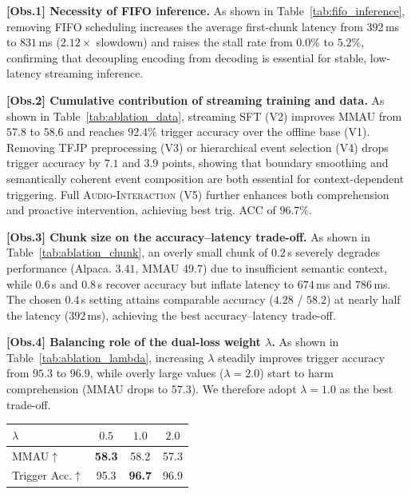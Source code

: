 \documentclass{article}
\begin{document}
\textbf{[Obs.1] Necessity of FIFO inference.} As shown in Table~\ref{tab:fifo_inference}, removing FIFO scheduling increases the average first-chunk latency from $392$\,ms to $831$\,ms ($2.12\times$ slowdown) and raises the stall rate from $0.0\%$ to $5.2\%$, confirming that decoupling encoding from decoding is essential for stable, low-latency streaming inference.

\textbf{[Obs.2] Cumulative contribution of streaming training and data.} As shown in Table~\ref{tab:ablation_data}, streaming SFT (V2) improves MMAU from $57.8$ to $58.6$ and reaches $92.4\%$ trigger accuracy over the offline base (V1). Removing TFJP preprocessing (V3) or hierarchical event selection (V4) drops trigger accuracy by $7.1$ and $3.9$ points, showing that boundary smoothing and semantically coherent event composition are both essential for context-dependent triggering. Full \textsc{Audio-Interaction} (V5) further enhances both comprehension and proactive intervention, achieving best trig. ACC of $96.7\%$.

\textbf{[Obs.3] Chunk size on the accuracy--latency trade-off.} As shown in Table~\ref{tab:ablation_chunk}, an overly small chunk of $0.2$\,s severely degrades performance (Alpaca. $3.41$, MMAU $49.7$) due to insufficient semantic context, while $0.6$\,s and $0.8$\,s recover accuracy but inflate latency to $674$\,ms and $786$\,ms. The chosen $0.4$\,s setting attains comparable accuracy ($4.28$ / $58.2$) at nearly half the latency ($392$\,ms), achieving the best accuracy--latency trade-off.

\vspace{-3mm}
\begin{minipage}[t]{0.61\textwidth}
\vspace{0mm}
\textbf{[Obs.4] Balancing role of the dual-loss weight $\lambda$.} As shown in Table~\ref{tab:ablation_lambda}, increasing $\lambda$ steadily improves trigger accuracy from $95.3$ to $96.9$, while overly large values ($\lambda{=}2.0$) start to harm comprehension (MMAU drops to $57.3$). We therefore adopt $\lambda{=}1.0$ as the best trade-off.
\end{minipage}
\hfill
\begin{minipage}[t]{0.40\textwidth}
\centering
\small
\setlength{\tabcolsep}{5pt}
\renewcommand{\arraystretch}{0.85}
\vspace{-2mm}
\label{tab:ablation_lambda}
\begin{tabular}{@{}lccc@{}}
\toprule
$\lambda$               & $0.5$  & $1.0$  & $2.0$  \\
\midrule
MMAU$\uparrow$          &\textbf{ 58.3 }  & 58.2   & 57.3   \\
Trigger Acc.$\uparrow$   & 95.3   & \textbf{96.7}   & 96.9   \\
\bottomrule
\end{tabular}
\end{minipage}
\end{document}
